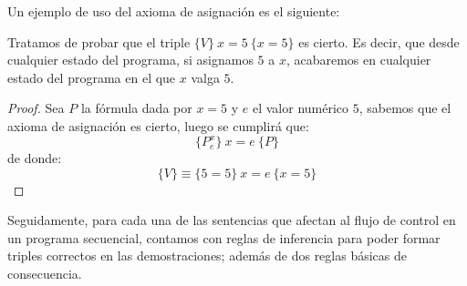 \begin{ejemplo}
    Un ejemplo de uso del axioma de asignación es el siguiente:

    Tratamos de probar que el triple $\{V\}\ x=5\ \{x=5\}$ es cierto. Es decir, que desde cualquier estado del programa, si asignamos $5$ a $x$, acabaremos en cualquier estado del programa en el que $x$ valga $5$.
    \begin{proof}
        Sea $P$ la fórmula dada por $x=5$ y $e$ el valor numérico $5$, sabemos que el axioma de asignación es cierto, luego se cumplirá que:
        \begin{equation*}
            \{P_e^x\}\ x=e\ \{P\}
        \end{equation*}
        de donde:
        \begin{equation*}
            \{V\} \equiv \{5=5\}\ x=e\ \{x=5\}
        \end{equation*}
        
    \end{proof}
\end{ejemplo}

Seguidamente, para cada una de las sentencias que afectan al flujo de control en un programa secuencial, contamos con reglas de inferencia para poder formar triples correctos en las demostraciones; además de dos reglas básicas de consecuencia.

